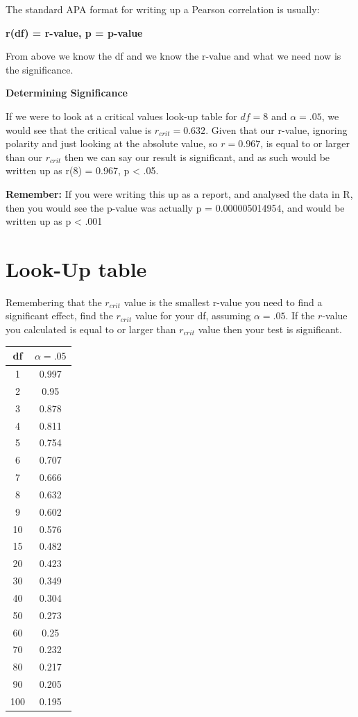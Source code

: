 \documentclass[
  oneside]{book}
\begin{document}
The standard APA format for writing up a Pearson correlation is usually:

\textbf{r(df) = r-value, p = p-value}

From above we know the df and we know the r-value and what we need now is the significance.

\textbf{Determining Significance}

If we were to look at a critical values look-up table for \(df = 8\) and \(\alpha = .05\), we would see that the critical value is \(r_{crit} = 0.632\). Given that our r-value, ignoring polarity and just looking at the absolute value, so \(r = 0.967\), is equal to or larger than our \(r_{crit}\) then we can say our result is significant, and as such would be written up as r(8) = 0.967, p \textless{} .05.

\textbf{Remember:} If you were writing this up as a report, and analysed the data in R, then you would see the p-value was actually p = 0.000005014954, and would be written up as p \textless{} .001

\hypertarget{look-up-table-2}{%
\section{Look-Up table}\label{look-up-table-2}}

Remembering that the \(r_{crit}\) value is the smallest r-value you need to find a significant effect, find the \(r_{crit}\) value for your df, assuming \(\alpha = .05\). If the \(r\)-value you calculated is equal to or larger than \(r_{crit}\) value then your test is significant.

\begin{longtable}[]{@{}cc@{}}
\toprule
df & \(\alpha = .05\) \\
\midrule
\endhead
1 & 0.997 \\
2 & 0.95 \\
3 & 0.878 \\
4 & 0.811 \\
5 & 0.754 \\
6 & 0.707 \\
7 & 0.666 \\
8 & 0.632 \\
9 & 0.602 \\
10 & 0.576 \\
15 & 0.482 \\
20 & 0.423 \\
30 & 0.349 \\
40 & 0.304 \\
50 & 0.273 \\
60 & 0.25 \\
70 & 0.232 \\
80 & 0.217 \\
90 & 0.205 \\
100 & 0.195 \\
\bottomrule
\end{longtable}
\end{document}
